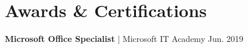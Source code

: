 \section{Awards \& Certifications}
\textbf{Microsoft Office Specialist} | Microsoft IT Academy \hfill Jun. 2019
